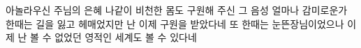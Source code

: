 아놀라우신 주님의 은혜 나같이 비천한
몸도 구원해 주신 그 음성
얼마나 감미로운가
한때는 길을 잃고 헤매었지만
난 이제 구원을 받았다네
또 한때는 눈뜬장님이었으나 이제 난 볼 수
없었던 영적인 세계도 볼 수 있다네
